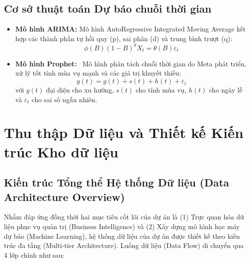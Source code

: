 \documentclass[12pt,a4paper]{article}
\begin{document}
\subsection{Cơ sở thuật toán Dự báo chuỗi thời gian}
\label{sec:forecast_theory}

\begin{itemize}
    \item \textbf{Mô hình ARIMA:} Mô hình AutoRegressive Integrated Moving Average kết hợp các thành phần tự hồi quy (p), sai phân (d) và trung bình trượt (q):
    \begin{equation}
        \phi(B)(1-B)^d X_t = \theta(B) \varepsilon_t
    \end{equation}
    \item \textbf{Mô hình Prophet:}~\cite{taylor2018prophet} Mô hình phân tách chuỗi thời gian do Meta phát triển, xử lý tốt tính mùa vụ mạnh và các giá trị khuyết thiếu:
    \begin{equation}
        y(t) = g(t) + s(t) + h(t) + \varepsilon_t
    \end{equation}
    với $g(t)$ đại diện cho xu hướng, $s(t)$ cho tính mùa vụ, $h(t)$ cho ngày lễ và $\varepsilon_t$ cho sai số ngẫu nhiên.
\end{itemize}


\section{Thu thập Dữ liệu và Thiết kế Kiến trúc Kho dữ liệu}
\label{chap:thuthap_kho}

\subsection{Kiến trúc Tổng thể Hệ thống Dữ liệu (Data Architecture Overview)}
\label{sec:data_architecture}

Nhằm đáp ứng đồng thời hai mục tiêu cốt lõi của dự án là (1) Trực quan hóa dữ liệu phục vụ quản trị (Business Intelligence) và (2) Xây dựng mô hình học máy dự báo (Machine Learning), hệ thống dữ liệu của dự án được thiết kế theo kiến trúc đa tầng (Multi-tier Architecture). Luồng dữ liệu (Data Flow) di chuyển qua 4 lớp chính như sau:
\end{document}
